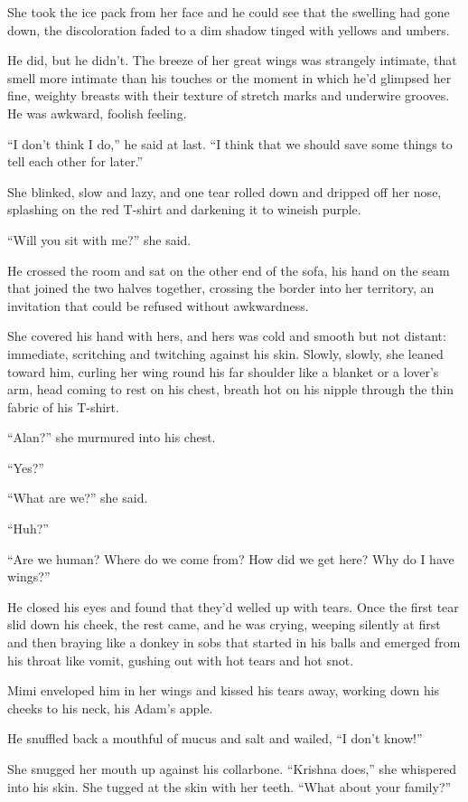She took the ice pack from her face and he could see that the swelling
had gone down, the discoloration faded to a dim shadow tinged with
yellows and umbers.

He did, but he didn't.  The breeze of her great wings was strangely
intimate, that smell more intimate than his touches or the moment in
which he'd glimpsed her fine, weighty breasts with their texture of
stretch marks and underwire grooves.  He was awkward, foolish feeling.

``I don't think I do,'' he said at last.  ``I think that we should
save some things to tell each other for later.''

She blinked, slow and lazy, and one tear rolled down and dripped off
her nose, splashing on the red T-shirt and darkening it to wineish
purple.

``Will you sit with me?'' she said.

He crossed the room and sat on the other end of the sofa, his hand on
the seam that joined the two halves together, crossing the border into
her territory, an invitation that could be refused without
awkwardness.

She covered his hand with hers, and hers was cold and smooth but not
distant:  immediate, scritching and twitching against his skin. 
Slowly, slowly, she leaned toward him, curling her wing round his far
shoulder like a blanket or a lover's arm, head coming to rest on his
chest, breath hot on his nipple through the thin fabric of his
T-shirt.

``Alan?'' she murmured into his chest.

``Yes?''

``What are we?'' she said.

``Huh?''

``Are we human?  Where do we come from?  How did we get here?  Why do
I have wings?''

He closed his eyes and found that they'd welled up with tears.  Once
the first tear slid down his cheek, the rest came, and he was crying,
weeping silently at first and then braying like a donkey in sobs that
started in his balls and emerged from his throat like vomit, gushing
out with hot tears and hot snot.

Mimi enveloped him in her wings and kissed his tears away, working
down his cheeks to his neck, his Adam's apple.

He snuffled back a mouthful of mucus and salt and wailed, ``I don't
know!''

She snugged her mouth up against his collarbone.  ``Krishna does,''
she whispered into his skin.  She tugged at the skin with her teeth. 
``What about your family?''

